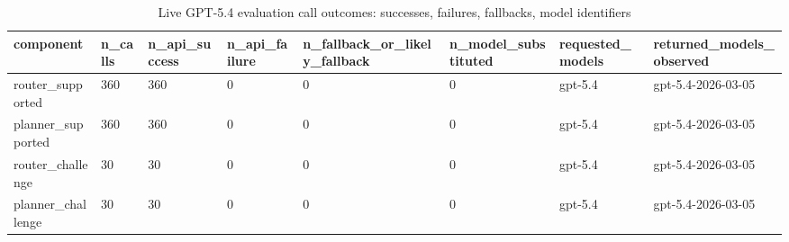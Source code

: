 \begin{table}[ht]
\centering
\caption{Live GPT-5.4 evaluation call outcomes: successes, failures, fallbacks, model identifiers}
\label{tab:live_run_summary}
\begin{tabular}{llllllll}
\toprule
component & n\_calls & n\_api\_success & n\_api\_failure & n\_fallback\_or\_likely\_fallback & n\_model\_substituted & requested\_models & returned\_models\_observed \\
\midrule
router\_supported & 360 & 360 & 0 & 0 & 0 & gpt-5.4 & gpt-5.4-2026-03-05 \\
planner\_supported & 360 & 360 & 0 & 0 & 0 & gpt-5.4 & gpt-5.4-2026-03-05 \\
router\_challenge & 30 & 30 & 0 & 0 & 0 & gpt-5.4 & gpt-5.4-2026-03-05 \\
planner\_challenge & 30 & 30 & 0 & 0 & 0 & gpt-5.4 & gpt-5.4-2026-03-05 \\
\bottomrule
\end{tabular}
\end{table}
